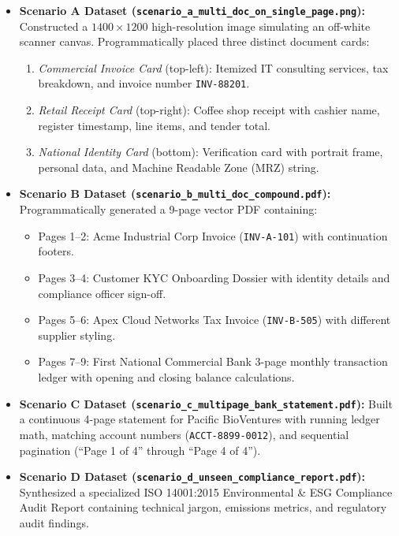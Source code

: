 \documentclass[11pt,a4paper]{article}
\begin{document}
\begin{itemize}[leftmargin=*]
    \item \textbf{Scenario A Dataset (\texttt{scenario\_a\_multi\_doc\_on\_single\_page.png}):} Constructed a $1400 \times 1200$ high-resolution image simulating an off-white scanner canvas. Programmatically placed three distinct document cards:
    \begin{enumerate}[label=(\alph*), noitemsep]
        \item \textit{Commercial Invoice Card} (top-left): Itemized IT consulting services, tax breakdown, and invoice number \texttt{INV-88201}.
        \item \textit{Retail Receipt Card} (top-right): Coffee shop receipt with cashier name, register timestamp, line items, and tender total.
        \item \textit{National Identity Card} (bottom): Verification card with portrait frame, personal data, and Machine Readable Zone (MRZ) string.
    \end{enumerate}

    \item \textbf{Scenario B Dataset (\texttt{scenario\_b\_multi\_doc\_compound.pdf}):} Programmatically generated a 9-page vector PDF containing:
    \begin{itemize}[noitemsep]
        \item Pages 1--2: Acme Industrial Corp Invoice (\texttt{INV-A-101}) with continuation footers.
        \item Pages 3--4: Customer KYC Onboarding Dossier with identity details and compliance officer sign-off.
        \item Pages 5--6: Apex Cloud Networks Tax Invoice (\texttt{INV-B-505}) with different supplier styling.
        \item Pages 7--9: First National Commercial Bank 3-page monthly transaction ledger with opening and closing balance calculations.
    \end{itemize}

    \item \textbf{Scenario C Dataset (\texttt{scenario\_c\_multipage\_bank\_statement.pdf}):} Built a continuous 4-page statement for Pacific BioVentures with running ledger math, matching account numbers (\texttt{ACCT-8899-0012}), and sequential pagination (``Page 1 of 4'' through ``Page 4 of 4'').

    \item \textbf{Scenario D Dataset (\texttt{scenario\_d\_unseen\_compliance\_report.pdf}):} Synthesized a specialized ISO 14001:2015 Environmental \& ESG Compliance Audit Report containing technical jargon, emissions metrics, and regulatory audit findings.
\end{itemize}
\end{document}
